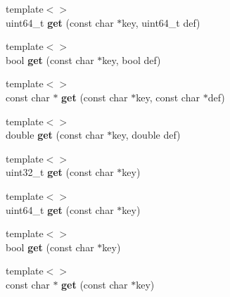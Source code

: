 \begin{DoxyCompactItemize}
\item 
\hypertarget{classConfig_ab7c8f41f1f68386d5c5aa220b04a6395}{{\footnotesize template$<$$>$ }\\uint64\-\_\-t {\bfseries get} (const char $\ast$key, uint64\-\_\-t def)}\label{classConfig_ab7c8f41f1f68386d5c5aa220b04a6395}

\item 
\hypertarget{classConfig_aeb1e3d9528ac85d99ac240c127a230fe}{{\footnotesize template$<$$>$ }\\bool {\bfseries get} (const char $\ast$key, bool def)}\label{classConfig_aeb1e3d9528ac85d99ac240c127a230fe}

\item 
\hypertarget{classConfig_a7d43af7622dab5c20df7a02d0438db0f}{{\footnotesize template$<$$>$ }\\const char $\ast$ {\bfseries get} (const char $\ast$key, const char $\ast$def)}\label{classConfig_a7d43af7622dab5c20df7a02d0438db0f}

\item 
\hypertarget{classConfig_ae495cbb8c0575c30e9539d8ed6082a72}{{\footnotesize template$<$$>$ }\\double {\bfseries get} (const char $\ast$key, double def)}\label{classConfig_ae495cbb8c0575c30e9539d8ed6082a72}

\item 
\hypertarget{classConfig_a89ec1c95c45bfd3eedca3eb47d7e6b66}{{\footnotesize template$<$$>$ }\\uint32\-\_\-t {\bfseries get} (const char $\ast$key)}\label{classConfig_a89ec1c95c45bfd3eedca3eb47d7e6b66}

\item 
\hypertarget{classConfig_a83e49ae726af6b833f6d655471980426}{{\footnotesize template$<$$>$ }\\uint64\-\_\-t {\bfseries get} (const char $\ast$key)}\label{classConfig_a83e49ae726af6b833f6d655471980426}

\item 
\hypertarget{classConfig_a35b80ae4143a735dbb8cd979e31d9f30}{{\footnotesize template$<$$>$ }\\bool {\bfseries get} (const char $\ast$key)}\label{classConfig_a35b80ae4143a735dbb8cd979e31d9f30}

\item 
\hypertarget{classConfig_a868b65b13b4d843b22126a73e0d119b4}{{\footnotesize template$<$$>$ }\\const char $\ast$ {\bfseries get} (const char $\ast$key)}\label{classConfig_a868b65b13b4d843b22126a73e0d119b4}


\end{DoxyCompactItemize}

